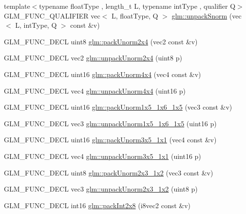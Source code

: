 \begin{DoxyCompactItemize}
\item 
{\footnotesize template$<$typename float\+Type , length\+\_\+t L, typename int\+Type , qualifier Q$>$ }\\G\+L\+M\+\_\+\+F\+U\+N\+C\+\_\+\+Q\+U\+A\+L\+I\+F\+I\+ER vec$<$ L, float\+Type, Q $>$ \hyperlink{group__gtc__packing_ga6d49b31e5c3f9df8e1f99ab62b999482}{glm\+::unpack\+Snorm} (vec$<$ L, int\+Type, Q $>$ const \&v)
\item 
G\+L\+M\+\_\+\+F\+U\+N\+C\+\_\+\+D\+E\+CL uint8 \hyperlink{group__gtc__packing_gad68eb2f848ba867192b8787998c0595a}{glm\+::pack\+Unorm2x4} (vec2 const \&v)
\item 
G\+L\+M\+\_\+\+F\+U\+N\+C\+\_\+\+D\+E\+CL vec2 \hyperlink{group__gtc__packing_ga3afb0452954320f2d83fe6f38cb24147}{glm\+::unpack\+Unorm2x4} (uint8 p)
\item 
G\+L\+M\+\_\+\+F\+U\+N\+C\+\_\+\+D\+E\+CL uint16 \hyperlink{group__gtc__packing_gad493c9f130e91dd8a4b360b05dcea573}{glm\+::pack\+Unorm4x4} (vec4 const \&v)
\item 
G\+L\+M\+\_\+\+F\+U\+N\+C\+\_\+\+D\+E\+CL vec4 \hyperlink{group__gtc__packing_ga38a0a518d53e15a9481c31dc1e574a40}{glm\+::unpack\+Unorm4x4} (uint16 p)
\item 
G\+L\+M\+\_\+\+F\+U\+N\+C\+\_\+\+D\+E\+CL uint16 \hyperlink{group__gtc__packing_ga0fcb493167d540aca105d11df5c55503}{glm\+::pack\+Unorm1x5\+\_\+1x6\+\_\+1x5} (vec3 const \&v)
\item 
G\+L\+M\+\_\+\+F\+U\+N\+C\+\_\+\+D\+E\+CL vec3 \hyperlink{group__gtc__packing_ga6804d0525daf68bcac226f46fbb3b24e}{glm\+::unpack\+Unorm1x5\+\_\+1x6\+\_\+1x5} (uint16 p)
\item 
G\+L\+M\+\_\+\+F\+U\+N\+C\+\_\+\+D\+E\+CL uint16 \hyperlink{group__gtc__packing_ga1b41375846ed66768da78ca299d8d010}{glm\+::pack\+Unorm3x5\+\_\+1x1} (vec4 const \&v)
\item 
G\+L\+M\+\_\+\+F\+U\+N\+C\+\_\+\+D\+E\+CL vec4 \hyperlink{group__gtc__packing_gaab3b476e8f320670717fd518f350ce28}{glm\+::unpack\+Unorm3x5\+\_\+1x1} (uint16 p)
\item 
G\+L\+M\+\_\+\+F\+U\+N\+C\+\_\+\+D\+E\+CL uint8 \hyperlink{group__gtc__packing_ga0acca4eb99c300fe2edeef7ebd8fa08b}{glm\+::pack\+Unorm2x3\+\_\+1x2} (vec3 const \&v)
\item 
G\+L\+M\+\_\+\+F\+U\+N\+C\+\_\+\+D\+E\+CL vec3 \hyperlink{group__gtc__packing_gaeeacc5275329100c50fe8fc0871eb423}{glm\+::unpack\+Unorm2x3\+\_\+1x2} (uint8 p)
\item 
G\+L\+M\+\_\+\+F\+U\+N\+C\+\_\+\+D\+E\+CL int16 \hyperlink{group__gtc__packing_ga532b06d8915c6c65649f828e9106a1d9}{glm\+::pack\+Int2x8} (i8vec2 const \&v)

\end{DoxyCompactItemize}
